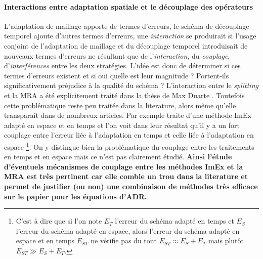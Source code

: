     \paragraph{Interactions entre adaptation spatiale et le découplage des opérateurs}
        L'adaptation de maillage apporte de termes d'erreurs,
        le schéma de découplage temporel ajoute d'autres termes d'erreurs, 
        une \textit{interaction} se produirait si l'usage conjoint 
        de l'adaptation de maillage et du découplage temporel introduisait de nouveaux termes d'erreurs ne résultant que de l'\textit{interaction},
        du \textit{couplage}, d'\textit{interférences} entre les deux stratégies. L'idée est donc de déterminer si ces termes d'erreurs existent et si oui quelle est leur magnitude ? Portent-ils significativement préjudice à la qualité du schéma ? 
        L'interaction entre le \textit{splitting} et la MRA a été explicitement traité dans la thèse de Max Duarte \cite{duart2011}.    
        Toutefois cette problématique reste peu traitée dans la literature, alors même qu'elle transparaît dans de nombreux articles.
        Par exemple \cite{Zhang2025IMEXTSA} traite d'une méthode ImEx adapté en espace et en temps et l'on voit dans leur résultat qu'il y a un fort 
        couplage entre l'erreur liée à l'adaptation en temps et celle liée à l'adaptation en espace
        \footnote{C'est à dire que si l'on note $E_T$ l'erreur du schéma adapté en temps et $E_S$ l'erreur du schéma adapté en espace,
        alors l'erreur du schéma adapté en espace et en temps $E_{ST}$ ne vérifie pas du tout $E_{ST}\approx E_S + E_T$ mais plutôt $E_{ST} \gg E_S + E_T$.}. 
        On y distingue bien la problématique du couplage entre les traitements en temps et en espace mais ce n'est pas clairement étudié.
        \textbf{Ainsi l'étude d'éventuels mécanismes de couplage entre les méthodes ImEx et la MRA est très pertinent car elle comble un trou dans la literature et permet de justifier (ou non) une combinaison de méthodes très efficace sur le papier pour les équations d'ADR.}
